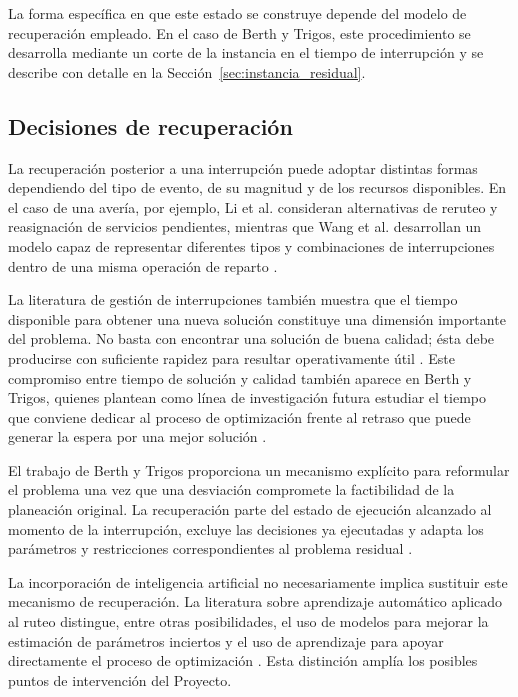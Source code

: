 \documentclass[11pt]{article}
\begin{document}
La forma específica en que este estado se construye depende del modelo de recuperación
empleado. En el caso de Berth y Trigos, este procedimiento se desarrolla mediante un
corte de la instancia en el tiempo de interrupción y se describe con detalle en la
Sección~\ref{sec:instancia_residual}.

\subsection{Decisiones de recuperación}

La recuperación posterior a una interrupción puede adoptar distintas formas dependiendo del tipo de evento, de su magnitud y de los recursos disponibles. En el caso de una avería, por ejemplo, Li et al. consideran alternativas de reruteo y reasignación de servicios pendientes, mientras que Wang et al. desarrollan un modelo capaz de representar diferentes tipos y combinaciones de interrupciones dentro de una misma operación de reparto \parencite{li_mirchandani_borenstein_2009,wang_ruan_shi_2012}.

La literatura de gestión de interrupciones también muestra que el tiempo disponible para obtener una nueva solución constituye una dimensión importante del problema. No basta con encontrar una solución de buena calidad; ésta debe producirse con suficiente rapidez para resultar operativamente útil \parencite{eglese_zambirinis_2018}. Este compromiso entre tiempo de solución y calidad también aparece en Berth y Trigos, quienes plantean como línea de investigación futura estudiar el tiempo que conviene dedicar al proceso de optimización frente al retraso que puede generar la espera por una mejor solución \parencite{berth_trigos_2025}.

El trabajo de Berth y Trigos proporciona un mecanismo explícito para reformular el problema una vez que una desviación compromete la factibilidad de la planeación original. La recuperación parte del estado de ejecución alcanzado al momento de la interrupción, excluye las decisiones ya ejecutadas y adapta los parámetros y restricciones correspondientes al problema residual \parencite{berth_trigos_2025,berth_thesis_2025}.

La incorporación de inteligencia artificial no necesariamente implica sustituir este mecanismo de recuperación. La literatura sobre aprendizaje automático aplicado al ruteo distingue, entre otras posibilidades, el uso de modelos para mejorar la estimación de parámetros inciertos y el uso de aprendizaje para apoyar directamente el proceso de optimización \parencite{bai_et_al_2023}. Esta distinción amplía los posibles puntos de intervención del Proyecto.
\end{document}
